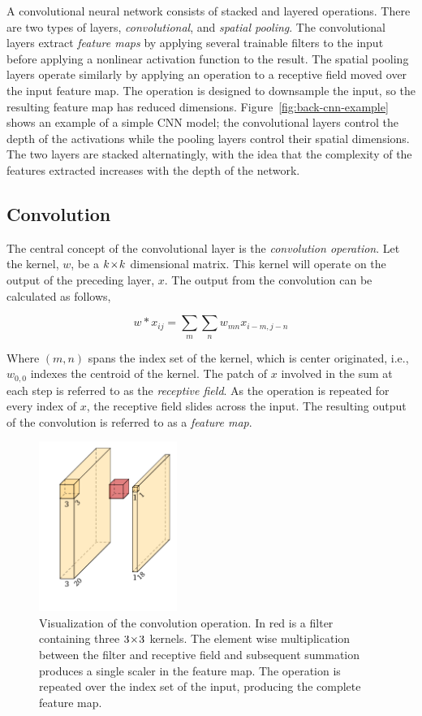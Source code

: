A convolutional neural network consists of stacked and layered operations.
There are two types of layers, \textit{convolutional}, and \textit{spatial pooling}.
The convolutional layers extract \textit{feature maps} by applying several trainable filters to the input before applying a nonlinear activation function to the result.
The spatial pooling layers operate similarly by applying an operation to a receptive field moved over the input feature map.
The operation is designed to downsample the input, so the resulting feature map has reduced dimensions.
Figure~\ref{fig:back-cnn-example} shows an example of a simple CNN model; the convolutional layers control the depth of the activations while the pooling layers control their spatial dimensions.
The two layers are stacked alternatingly, with the idea that the complexity of the features extracted increases with the depth of the network.

\subsection{Convolution}
The central concept of the convolutional layer is the \textit{convolution operation}.
Let the kernel, \(w\), be a \(k\!\times \! k\) dimensional matrix.
This kernel will operate on the output of the preceding layer, \(x\).
The output from the convolution can be calculated as follows,

\[w\ast x_{ij}=\sum_{m}\sum_{n}  w_{mn}x_{i-m,j-n}\]

Where \((m,n)\) spans the index set of the kernel, which is center originated, i.e., \(w_{0,0}\) indexes the centroid of the kernel.
The patch of \(x\) involved in the sum at each step is referred to as the \textit{receptive field}.
As the operation is repeated for every index of \(x\), the receptive field slides across the input.
The resulting output of the convolution is referred to as a \textit{feature map}.

\begin{figure}[htb]
  \centering
  \includegraphics[width=0.4\textwidth]{figs/background/conv.pdf}
  \caption[Convolution operation]{Visualization of the convolution operation.
In red is a filter containing three \(3\!\times \! 3\) kernels.
The element wise multiplication between the filter and receptive field and subsequent summation produces a single scaler in the feature map.
The operation is repeated over the index set of the input, producing the complete feature map.}\label{fig:cnn}
\end{figure}

